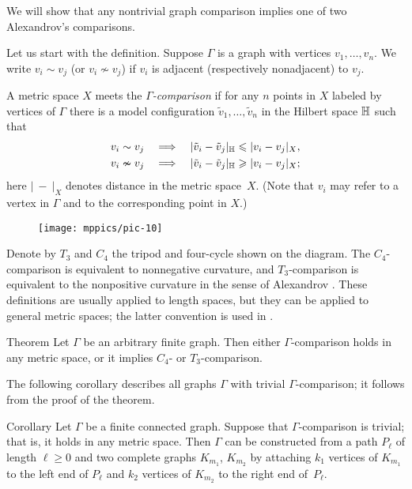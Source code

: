 \documentclass{article}
\begin{document}
We will show that any nontrivial graph comparison implies one of two Alexandrov's comparisons.

Let us start with the definition.
Suppose $\Gamma$ is a graph with vertices $v_1,\dots,v_n$.
We write $v_i\sim v_j$ (or $v_i\nsim v_j$) if $v_i$ is adjacent (respectively nonadjacent) to $v_j$.

A metric space $X$ meets the \emph{$\Gamma$-comparison} if for any $n$ points in $X$ labeled by vertices of $\Gamma$ there is a model configuration $\tilde v_1,\dots,\tilde v_n$ in the Hilbert space $\mathbb H$ such that 
\begin{align*}
v_i\sim v_j\quad&\Longrightarrow\quad|\tilde v_i-\tilde v_j|_{\mathbb H}\leqslant | v_i-v_j|_{X},
\\
v_i\nsim v_j\quad&\Longrightarrow\quad|\tilde v_i-\tilde v_j|_{\mathbb H}\geqslant | v_i-v_j|_{X};
\end{align*}
here $|\ -\ |_X$ denotes distance in the metric space~$X$.
(Note that $v_i$ may refer to a vertex in $\Gamma$ and to the corresponding point in $X$.)

\begin{wrapfigure}{r}{35 mm}
\vskip-0mm
\centering
\texttt{[image: mppics/pic-10]}
\end{wrapfigure}

Denote by $T_3$ and $C_4$ the tripod and four-cycle shown on the diagram.
The $C_4$-comparison is equivalent to nonnegative curvature,
and $T_3$-comparison is equivalent to the nonpositive curvature in the sense of Alexandrov \cite{lebedeva-petrunin-zolotov}.
These definitions are usually applied to length spaces, but they can be applied to general metric spaces;
the latter convention is used in \cite{alexander2019alexandrov}.

\begin{thm}{Theorem}
Let $\Gamma$ be an arbitrary finite graph.
Then either $\Gamma$-comparison holds in any metric space,
or it implies $C_4$- or $T_3$-comparison.
\end{thm}

The following corollary describes all graphs $\Gamma$ with trivial $\Gamma$-comparison;
it follows from the proof of the theorem.

\begin{thm}{Corollary} Let $\Gamma$ be a finite connected graph.
Suppose that $\Gamma$-comparison is trivial;
that is, it holds in any metric space.
Then $\Gamma$ can be constructed from a path $P_{\ell}$ of length $\ell\ge 0$ and two complete graphs $K_{m_1}$, $K_{m_2}$ by attaching $k_1$ vertices of $K_{m_1}$ to the left end of $P_{\ell}$ and $k_2$ vertices of $K_{m_2}$ to the right end of~$P_{\ell}$.
\end{thm}
\end{document}
